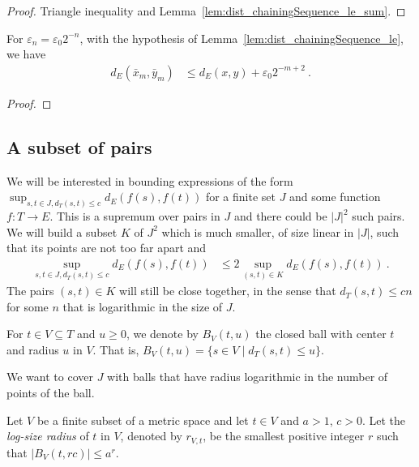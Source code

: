 \begin{proof}\leanok
Triangle inequality and Lemma~\ref{lem:dist_chainingSequence_le_sum}.
\end{proof}


\begin{corollary}\label{cor:dist_chainingSequence_pow_two_le}
  \leanok
For $\varepsilon_n = \varepsilon_0 2^{-n}$, with the hypothesis of Lemma~\ref{lem:dist_chainingSequence_le}, we have
\begin{align*}
  d_E(\bar{x}_m, \bar{y}_m)
  &\le d_E(x, y) + \varepsilon_0 2^{-m+2}
  \: .
\end{align*}
\end{corollary}

\begin{proof}\leanok

\end{proof}


\subsection{A subset of pairs}

We will be interested in bounding expressions of the form $\sup_{s,t\in J, d_T(s,t) \le c} d_E(f(s), f(t))$ for a finite set $J$ and some function $f : T \to E$.
This is a supremum over pairs in $J$ and there could be $\vert J \vert^2$ such pairs.
We will build a subset $K$ of $J^2$ which is much smaller, of size linear in $\vert J \vert$, such that its points are not too far apart and
\begin{align*}
  \sup_{s,t\in J, d_T(s,t) \le c} d_E(f(s), f(t))
  & \le 2 \sup_{(s,t) \in K} d_E(f(s), f(t))
  \: .
\end{align*}
The pairs $(s, t) \in K$ will still be close together, in the sense that $d_T(s, t) \le c n$ for some $n$ that is logarithmic in the size of $J$.

For $t \in V \subseteq T$ and $u\ge 0$, we denote by $B_V(t, u)$ the closed ball with center $t$ and radius $u$ in $V$.
That is, $B_V(t, u) = \{s \in V \mid d_T(s, t) \le u\}$.

We want to cover $J$ with balls that have radius logarithmic in the number of points of the ball.

\begin{definition}\label{def:logSizeRadius}
  \mathlibok
Let $V$ be a finite subset of a metric space and let $t \in V$ and $a > 1$, $c > 0$.
Let the \emph{log-size radius} of $t$ in $V$, denoted by $r_{V,t}$, be the smallest positive integer $r$ such that $\vert B_V(t, r c) \vert \le a^{r}$.
\end{definition}


